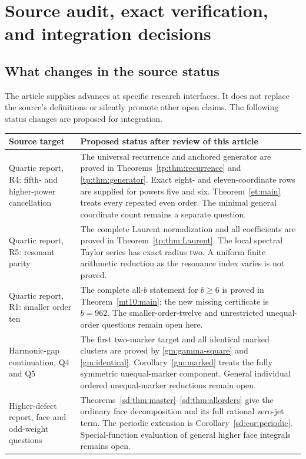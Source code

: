 \documentclass[11pt,a4paper]{article}
\numberwithin{equation}{section}
\theoremstyle{definition}
\theoremstyle{remark}
\begin{document}
\section{Source audit, exact verification, and integration decisions}
\label{sec:audit}

\subsection{What changes in the source status}

The article supplies advances at specific research interfaces. It does
not replace the source's definitions or silently promote other open
claims. The following status changes are proposed for integration.

\begingroup
\small
\begin{longtable}{@{}p{}p{}@{}}
\toprule
Source target & Proposed status after review of this article\\
\midrule
\endhead
Quartic report, R4: fifth- and higher-power cancellation &
The universal recurrence and anchored generator are proved in
Theorems~\ref{tp:thm:recurrence} and \ref{tp:thm:generator}. Exact
eight- and eleven-coordinate rows are supplied for powers five and six.
Theorem~\ref{et:main} treats every repeated even order. The minimal
general coordinate count remains a separate question.\\[5pt]
Quartic report, R5: resonant parity &
The complete Laurent normalization and all coefficients are proved in
Theorem~\ref{tp:thm:Laurent}. The local spectral Taylor series has exact
radius two. A uniform finite arithmetic reduction as the resonance
index varies is not proved.\\[5pt]
Quartic report, R1: smaller order ten &
The complete all-$b$ statement for $b\ge6$ is proved in
Theorem~\ref{mt10:main}; the new missing certificate is $b=962$.
The smaller-order-twelve and unrestricted unequal-order questions remain
open here.\\[5pt]
Harmonic-gap continuation, Q4 and Q5 &
The first two-marker target and all identical marked clusters are
proved by \eqref{gm:gamma-square} and \eqref{gm:identical}.
Corollary~\ref{gm:marked} treats the fully symmetric unequal-marker
component. General individual ordered unequal-marker reductions remain
open.\\[5pt]
Higher-defect report, face and odd-weight questions &
Theorems~\ref{sd:thm:master}--\ref{sd:thm:allorders} give the ordinary
face decomposition and its full rational zero-jet term. The periodic
extension is Corollary~\ref{sd:cor:periodic}. Special-function evaluation
of general higher face integrals remains open.\\
\bottomrule
\end{longtable}
\endgroup
\end{document}
